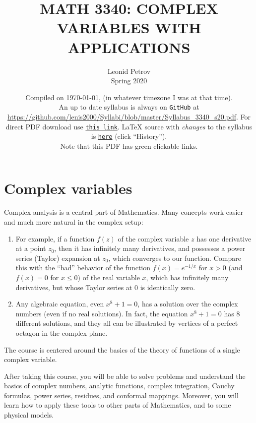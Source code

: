 \documentclass[oneside,11pt]{amsart}
\begin{document}
\title[MATH 3340: COMPLEX VARIABLES WITH APPLICATIONS]{MATH 3340: COMPLEX VARIABLES WITH APPLICATIONS}
\author{Leonid Petrov\\Spring 2020}
\date{Compiled on \today, \currenttime{} (in whatever timezone I was at that time).\\An up to date syllabus is always on \texttt{GitHub} at \url{https://github.com/lenis2000/Syllabi/blob/master/Syllabus_3340_s20.pdf}. For direct PDF download use \href{https://github.com/lenis2000/Syllabi/raw/master/Syllabus_3340_s20.pdf}{\texttt{this link}}.
	\LaTeX{} source with \textit{changes} to the syllabus is \href{https://github.com/lenis2000/Syllabi/blob/master/Syllabus_3340_s20.tex}{\texttt{here}}
(click ``History'').
\\Note that this PDF has green clickable links.}
\maketitle

\section{Complex variables}

Complex analysis is a central part of 
Mathematics. Many concepts work easier and much more natural
in the complex setup:
\begin{enumerate}
	\item 
For example, if a function $f(z)$ 
of the complex variable $z$
has one 
derivative at a point $z_0$, then it has infinitely many derivatives,
and possesses a power series (Taylor) expansion at $z_0$, which converges to our function. 
Compare this with the “bad” behavior of the function 
$f(x)=e^{-1/x}$ for $x>0$ (and $f(x)=0$ for $x\le 0$) of the real variable $x$,
which has infinitely many derivatives, but whose Taylor series at $0$ is 
identically zero.
\item Any algebraic equation, even $x^{8}+1=0$,
	has a solution over the complex numbers (even
	if no real solutions). In fact, 
	the equation $x^{8}+1=0$ has $8$ different
	solutions, and they all can be illustrated by vertices of a perfect octagon
	in the complex plane.
\end{enumerate}



The course is centered around the basics of the theory of functions of a
single complex variable.

\medskip

After taking this course, you 
will be able to solve problems and understand the 
basics of
complex numbers, analytic functions, 
complex integration, Cauchy formulas, power series, 
residues, and conformal mappings.
Moreover, you will learn how to apply these tools to 
other parts of Mathematics, and to some physical models.
\end{document}
